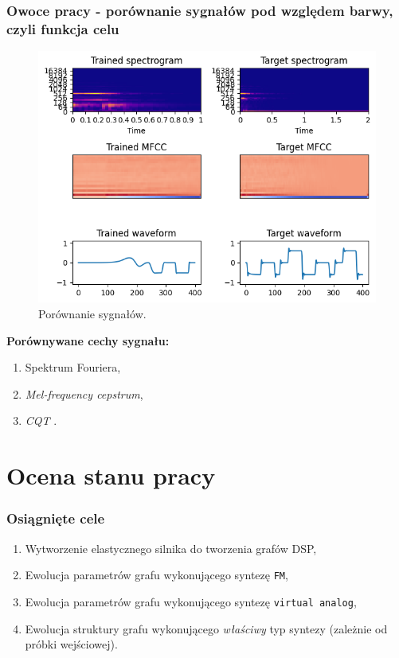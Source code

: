 \documentclass[]{beamer}
\begin{document}
\begin{frame}
  \frametitle{Owoce pracy - porównanie sygnałów pod względem barwy, czyli funkcja celu}

  \begin{multicols}{2}
  \begin{figure}
    \centering
    \includegraphics[width=1.0\linewidth]{example_signal_comparison.png}
    \caption{Porównanie sygnałów.}
  \end{figure}

    \textbf{Porównywane cechy sygnału:}
    \begin{enumerate}
      \item Spektrum Fouriera,
      \item \textit{Mel-frequency cepstrum},
      \item \textit{CQT} \cite{cqt}.
    \end{enumerate}
  
  \end{multicols}
\end{frame}


\section{Ocena stanu pracy}

\begin{frame}
  \frametitle{Osiągnięte cele}

  \begin{enumerate}
    \item Wytworzenie elastycznego silnika do tworzenia grafów DSP,
    \item Ewolucja parametrów grafu wykonującego syntezę \texttt{FM},
    \item Ewolucja parametrów grafu wykonującego syntezę \texttt{virtual analog},
    \item Ewolucja struktury grafu wykonującego \textit{właściwy} typ syntezy (zależnie od próbki wejściowej).
  \end{enumerate}
\end{frame}
\end{document}

